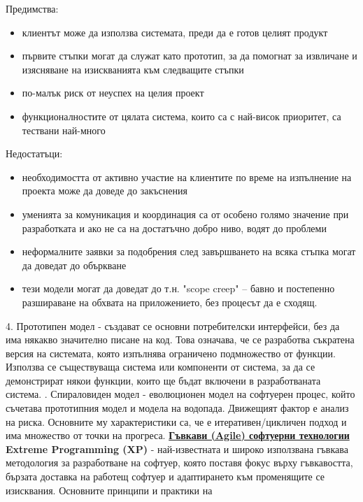 \documentclass{article}
\begin{document}
    Предимства:
\begin{itemize}
    \item клиентът може да използва системата, преди да е готов целият продукт
    \item първите стъпки могат да служат като прототип, за да помогнат за извличане и изясняване на изискванията към следващите стъпки
    \item по-малък риск от неуспех на целия проект
    \item функционалностите от цялата система, които са с най-висок приоритет, са тествани най-много
\end{itemize}
Недостатъци:
\begin{itemize}
    \item необходимостта от активно участие на клиентите по време на изпълнение на проекта може да доведе до закъснения
    \item уменията за комуникация и координация са от особено голямо значение при разработката и ако не са на достатъчно
    добро ниво, водят до проблеми
    \item неформалните заявки за подобрения след завършването на всяка стъпка могат да доведат до объркване 
    \item тези модели могат да доведат до т.н. "scope creep" – бавно и постепенно разшираване на обхвата на приложението,
    без процесът да е сходящ.
\end{itemize}
4. Прототипен модел - създават се основни потребителски интерфейси, без да има някакво значително писане на код. Това означава, че се разработва
съкратена версия на системата, която изпълнява ограничено подмножество от функции. Използва се съществуваща система или компоненти от система, за
да се демонстрират някои функции, които ще бъдат включени в разработваната система. \newline{}. Спираловиден модел - еволюционен модел на софтуерен процес, който съчетава прототипния модел и модела на водопада. Движещият
фактор е анализ на риска. Основните му характеристики са, че е итеративен/цикличен подход и има множество от точки на прогреса. \newline\newline
\textbf{\underline{Гъвкави (Agile) софтуерни технологии}} \newline\newline
\textbf{Extreme Programming (XP)} - най-известната и широко използвана гъвкава методология за разработване на софтуер, която поставя фокус върху
гъвкавостта, бързата доставка на работещ софтуер и адаптирането към променящите се изисквания. Основните принципи и практики на
\end{document}
